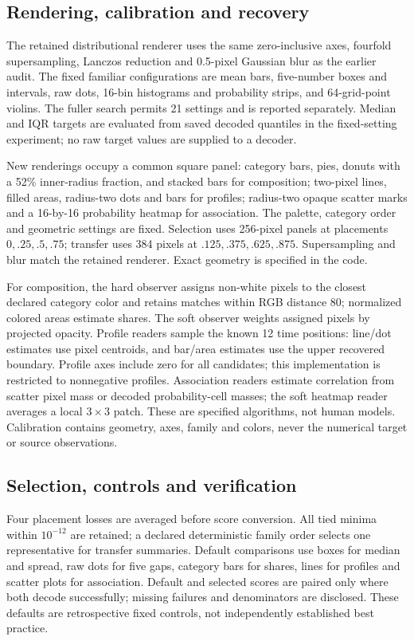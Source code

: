 \documentclass[11pt]{article}
\begin{document}
\subsection*{Rendering, calibration and recovery}
The retained distributional renderer uses the same zero-inclusive axes, fourfold supersampling, Lanczos reduction and 0.5-pixel Gaussian blur as the earlier audit. The fixed familiar configurations are mean bars, five-number boxes and intervals, raw dots, 16-bin histograms and probability strips, and 64-grid-point violins. The fuller search permits 21 settings and is reported separately. Median and IQR targets are evaluated from saved decoded quantiles in the fixed-setting experiment; no raw target values are supplied to a decoder.

New renderings occupy a common square panel: category bars, pies, donuts with a 52\% inner-radius fraction, and stacked bars for composition; two-pixel lines, filled areas, radius-two dots and bars for profiles; radius-two opaque scatter marks and a 16-by-16 probability heatmap for association. The palette, category order and geometric settings are fixed. Selection uses 256-pixel panels at placements $0,.25,.5,.75$; transfer uses 384 pixels at $.125,.375,.625,.875$. Supersampling and blur match the retained renderer. Exact geometry is specified in the code.

For composition, the hard observer assigns non-white pixels to the closest declared category color and retains matches within RGB distance 80; normalized colored areas estimate shares. The soft observer weights assigned pixels by projected opacity. Profile readers sample the known 12 time positions: line/dot estimates use pixel centroids, and bar/area estimates use the upper recovered boundary. Profile axes include zero for all candidates; this implementation is restricted to nonnegative profiles. Association readers estimate correlation from scatter pixel mass or decoded probability-cell masses; the soft heatmap reader averages a local $3\times3$ patch. These are specified algorithms, not human models. Calibration contains geometry, axes, family and colors, never the numerical target or source observations.

\subsection*{Selection, controls and verification}
Four placement losses are averaged before score conversion. All tied minima within $10^{-12}$ are retained; a declared deterministic family order selects one representative for transfer summaries. Default comparisons use boxes for median and spread, raw dots for five gaps, category bars for shares, lines for profiles and scatter plots for association. Default and selected scores are paired only where both decode successfully; missing failures and denominators are disclosed. These defaults are retrospective fixed controls, not independently established best practice.
\end{document}
